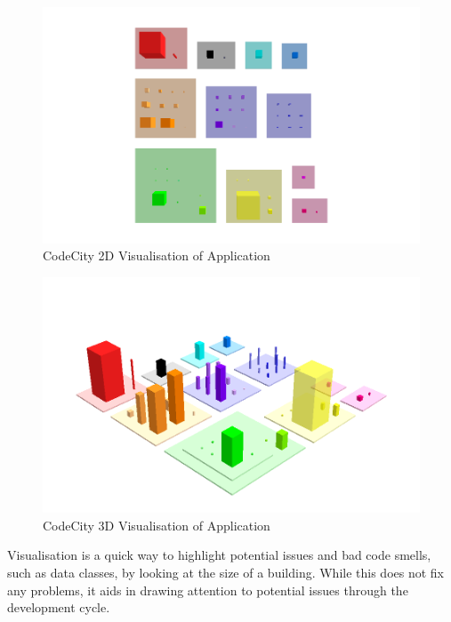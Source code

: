 \begin{figure}[H]
\begin{center}
\includegraphics[scale=0.5]{codecity2d.png}
\caption{CodeCity 2D Visualisation of Application}
\label{fig:2dcc}
\end{center}
\end{figure}

\begin{figure}[H]
\begin{center}
\includegraphics[scale=0.5]{codecity3d.png}
\caption{CodeCity 3D Visualisation of Application}
\label{fig:3dcc}
\end{center}
\end{figure}

Visualisation is a quick way to highlight potential issues and bad code smells, such as data classes, by looking at the size of a building. While this does not fix any problems, it aids in drawing attention to potential issues through the development cycle. 


